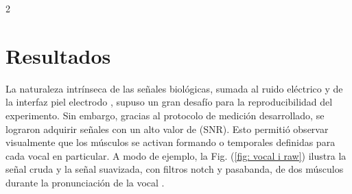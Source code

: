 \documentclass[11pt, letterpaper]{article}
\begin{document}
\begin{multicols*}{2}

\section{Resultados}

La naturaleza intrínseca de las señales biológicas, sumada al ruido eléctrico y de la interfaz piel electrodo \cite{informeElectrodos2025}, supuso un gran desafío para la reproducibilidad del experimento. Sin embargo, gracias al protocolo de medición desarrollado, se lograron adquirir señales con un alto valor de (SNR). Esto permitió observar visualmente que los músculos se activan formando  o  temporales definidas para cada vocal en particular. A modo de ejemplo, la Fig. (\ref{fig: vocal i raw}) ilustra la señal cruda y la señal suavizada, con filtros notch y pasabanda, de dos músculos durante la pronunciación de la vocal .


\end{multicols*}
\end{document}
